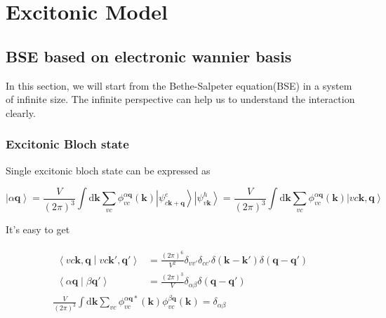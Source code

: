\section{Excitonic Model}

\subsection{BSE based on electronic wannier basis}\label{BSE-based-on-electronic-wannier-basis}

In this section, we will start from the Bethe-Salpeter equation(BSE) in a system of infinite size.
The infinite perspective can help us to understand the interaction clearly.

\subsubsection{Excitonic Bloch state}\label{Excitonic-Bloch-state}

Single excitonic bloch state can be expressed as

\begin{equation}
  \left| \alpha \boldsymbol{q} \right\rangle 
    = \frac{V}{(2\pi)^3} \int \mathrm{d}\boldsymbol{k} \sum_{vc} \phi_{vc}^{\alpha \boldsymbol{q}}(\boldsymbol{k}) 
      \left| \psi_{c \boldsymbol{k} + \boldsymbol{q}}^{e} \right\rangle \left| \psi_{v \boldsymbol{k}}^{h} \right\rangle 
    = \frac{V}{(2\pi)^3} \int \mathrm{d}\boldsymbol{k} \sum_{vc} \phi_{vc}^{\alpha \boldsymbol{q}}(\boldsymbol{k}) 
      \left| v c \boldsymbol{k}, \boldsymbol{q} \right\rangle 
\end{equation}

\noindent
It's easy to get

\begin{equation}
  \begin{gathered}
    \begin{aligned}
      \left\langle v c \boldsymbol{k}, \boldsymbol{q} \middle| v c \boldsymbol{k}', \boldsymbol{q}' \right\rangle
        &= \frac{(2\pi)^6}{V^2} \delta_{vv'} \delta_{cc'} \delta(\boldsymbol{k}-\boldsymbol{k}') \delta(\boldsymbol{q}-\boldsymbol{q}') \\
      \left\langle \alpha \boldsymbol{q} \middle| \beta \boldsymbol{q}' \right\rangle
        &= \frac{(2\pi)^3}{V} \delta_{\alpha\beta} \delta(\boldsymbol{q}-\boldsymbol{q}') 
    \end{aligned} \\
    \frac{V}{(2\pi)^3} \int \mathrm{d}\boldsymbol{k} \sum_{vc} 
      \phi_{vc}^{\alpha \boldsymbol{q}*}(\boldsymbol{k}) \phi_{vc}^{\beta \boldsymbol{q}}(\boldsymbol{k}) 
      = \delta_{\alpha\beta}
  \end{gathered}
\end{equation}

